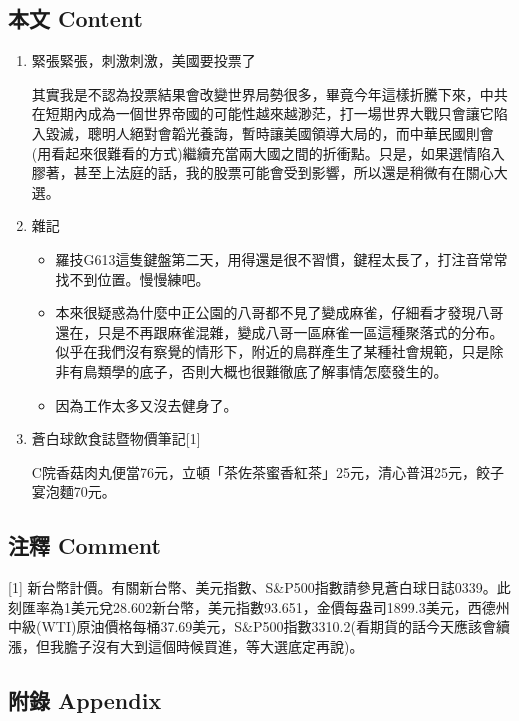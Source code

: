 \documentclass[a5paper, 11pt
]{book}
\providecommand{\tightlist}{%
  \setlength{\itemsep}{0pt}\setlength{\parskip}{0pt}}
\begin{document}
\hypertarget{ux672cux6587-content-60}{%
\subsection{本文 Content}\label{ux672cux6587-content-60}}

\begin{enumerate}
\def\labelenumi{\arabic{enumi}.}
\item
  緊張緊張，刺激刺激，美國要投票了

  其實我是不認為投票結果會改變世界局勢很多，畢竟今年這樣折騰下來，中共在短期內成為一個世界帝國的可能性越來越渺茫，打一場世界大戰只會讓它陷入毀滅，聰明人絕對會韜光養誨，暫時讓美國領導大局的，而中華民國則會(用看起來很難看的方式)繼續充當兩大國之間的折衝點。只是，如果選情陷入膠著，甚至上法庭的話，我的股票可能會受到影響，所以還是稍微有在關心大選。
\item
  雜記

  \begin{itemize}
  \tightlist
  \item
    羅技G613這隻鍵盤第二天，用得還是很不習慣，鍵程太長了，打注音常常找不到位置。慢慢練吧。
  \item
    本來很疑惑為什麼中正公園的八哥都不見了變成麻雀，仔細看才發現八哥還在，只是不再跟麻雀混雜，變成八哥一區麻雀一區這種聚落式的分布。似乎在我們沒有察覺的情形下，附近的鳥群產生了某種社會規範，只是除非有鳥類學的底子，否則大概也很難徹底了解事情怎麼發生的。
  \item
    因為工作太多又沒去健身了。
  \end{itemize}
\item
  蒼白球飲食誌暨物價筆記{[}1{]}

  C院香菇肉丸便當76元，立頓「茶佐茶蜜香紅茶」25元，清心普洱25元，餃子宴泡麵70元。
\end{enumerate}

\hypertarget{ux6ce8ux91cb-comment-60}{%
\subsection{注釋 Comment}\label{ux6ce8ux91cb-comment-60}}

{[}1{]}
新台幣計價。有關新台幣、美元指數、S\&P500指數請參見蒼白球日誌0339。此刻匯率為1美元兌28.602新台幣，美元指數93.651，金價每盎司1899.3美元，西德州中級(WTI)原油價格每桶37.69美元，S\&P500指數3310.2(看期貨的話今天應該會續漲，但我膽子沒有大到這個時候買進，等大選底定再說)。

\hypertarget{ux9644ux9304-appendix-60}{%
\subsection{附錄 Appendix}\label{ux9644ux9304-appendix-60}}
\end{document}
